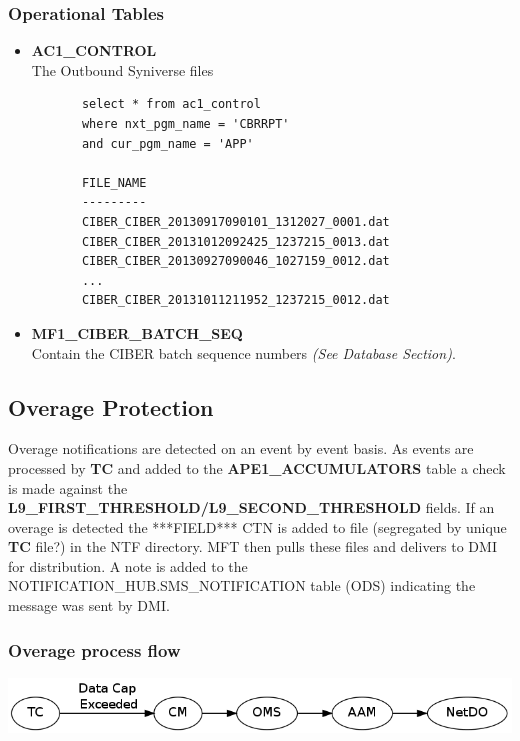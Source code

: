 \documentclass[12pt,twoside]{article}
\begin{document}
\subsubsection{Operational Tables}
\label{sec-3-6-2}
\begin{itemize}

\item \textbf{AC1\_CONTROL}\\
\label{sec-3-6-2-1}%
The Outbound Syniverse files
\begin{verbatim}
       select * from ac1_control
       where nxt_pgm_name = 'CBRRPT'
       and cur_pgm_name = 'APP'
      
       FILE_NAME
       ---------
       CIBER_CIBER_20130917090101_1312027_0001.dat
       CIBER_CIBER_20131012092425_1237215_0013.dat
       CIBER_CIBER_20130927090046_1027159_0012.dat
       ...
       CIBER_CIBER_20131011211952_1237215_0012.dat
\end{verbatim}

\item \textbf{MF1\_CIBER\_BATCH\_SEQ}\\
\label{sec-3-6-2-2}%
Contain the CIBER batch sequence numbers \emph{(See Database Section)}.
\end{itemize} %
\subsection{Overage Protection}
\label{sec-3-7}

   Overage notifications are detected on an event by event basis. As events are processed by \textbf{TC} and added to 
   the \textbf{APE1\_ACCUMULATORS} table a check is made against the \textbf{L9\_FIRST\_THRESHOLD/L9\_SECOND\_THRESHOLD} fields. If an overage is detected the ***FIELD*** CTN is added to file (segregated by unique \textbf{TC} file?) in the NTF directory. MFT then pulls these files and delivers to DMI for distribution. A note is added to the NOTIFICATION\_HUB.SMS\_NOTIFICATION table (ODS) indicating the message was sent by DMI.
\subsubsection{Overage process flow}
\label{sec-3-7-1}

   \includegraphics[width=15cm]{Pictures/overage.png}
\end{document}
